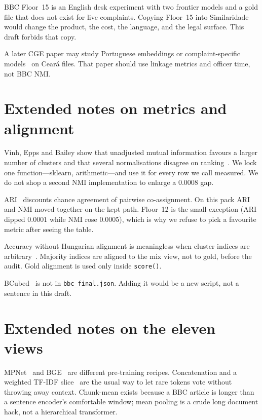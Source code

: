 \documentclass[11pt,a4paper]{article}
\begin{document}
BBC Floor~15 is an English desk experiment with two frontier
models and a gold file that does not exist for live
complaints. Copying Floor~15 into Similaridade would change
the product, the cost, the language, and the legal surface.
This draft forbids that copy.

A later CGE paper may study Portuguese embeddings
\cite{souza2020bertimbau} or complaint-specific
models~\cite{rakhimzhanov2025transport,esperanca2025complaint}
on Cear\'{a} files. That paper should use linkage metrics
and officer time, not BBC NMI.

\section{Extended notes on metrics and alignment}

Vinh, Epps and Bailey show that unadjusted mutual information
favours a larger number of clusters and that several
normalisations disagree on ranking~\cite{vinh2010nmi}. We
lock one function---sklearn, arithmetic---and use it for
every row we call measured. We do not shop a second NMI
implementation to enlarge a $0.0008$ gap.

ARI~\cite{hubert1985ari} discounts chance agreement of
pairwise co-assignment. On this pack ARI and NMI moved
together on the kept path. Floor~12 is the small exception
(ARI dipped $0.0001$ while NMI rose $0.0005$), which is why
we refuse to pick a favourite metric after seeing the table.

Accuracy without Hungarian alignment is meaningless when
cluster indices are arbitrary~\cite{kuhn1955hungarian}.
Majority indices are aligned to the mix view, not to gold,
before the audit. Gold alignment is used only inside
\texttt{score()}.

BCubed~\cite{amigo2009bcubed} is not in
\texttt{bbc\_final.json}. Adding it would be a new script,
not a sentence in this draft.

\section{Extended notes on the eleven views}

MPNet~\cite{song2020mpnet} and BGE~\cite{xiao2023cpack} are
different pre-training recipes. Concatenation and a weighted
TF-IDF slice~\cite{salton1988term} are the usual way to let
rare tokens vote without throwing away context. Chunk-mean
exists because a BBC article is longer than a sentence
encoder's comfortable window; mean pooling is a crude long
document hack, not a hierarchical transformer.
\end{document}
